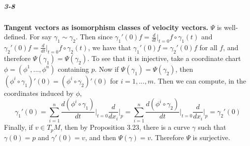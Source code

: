 \documentclass[10pt,letter]{article}
\begin{document}
\subparagraph{3-8} \textbf{Tangent vectors as isomorphism classes of velocity vectors.} $\Psi$ is well-defined. For say $\gamma_1 \sim \gamma_2$. Then since $\gamma_1'(0)f = \frac{d}{dt} \vert_{t=0} f \circ \gamma_1(t)$ and $\gamma_2'(0)f = \frac{d}{dt} \vert_{t=0} f \circ \gamma_2(t)$, we have that $\gamma_1'(0)f = \gamma_2'(0)f$ for all $f$, and therefore $\Psi(\gamma_1) = \Psi(\gamma_2)$. To see that it is injective, take a coordinate chart $\phi = (\phi^1,...,\phi^n)$ containing $p$. Now if $\Psi(\gamma_1) = \Psi(\gamma_2)$, then $(\phi^i \circ \gamma_1)'(0) = (\phi^i \circ \gamma_2)'(0)$ for $i=1,...,m$. Then we can compute, in the coordinates induced by $\phi$,
\begin{equation*}
\gamma_1'(0) = \sum_{i=1}^n \frac{d(\phi^i \circ \gamma_1)}{dt}\bigg \vert_{t=0} \frac{d}{dx_i} \bigg \vert_p = \sum_{i=1}^n \frac{d(\phi^i \circ \gamma_2)}{dt} \bigg \vert_{t=0} \frac{d}{dx_i} \bigg \vert_p  = \gamma_2'(0)
\end{equation*}
Finally, if $v \in T_pM$, then by Proposition 3.23, there is a curve $\gamma$ such that $\gamma(0) = p$ and $\gamma'(0) = v$, and then $\Psi(\gamma) = v$. Therefore $\Psi$ is surjective. 
\end{document}
